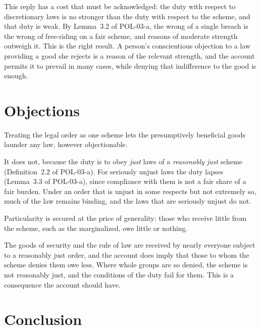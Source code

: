 \documentclass{situationist-preprint}
\begin{document}
This reply has a cost that must be acknowledged: the duty with respect to discretionary laws is no stronger than the duty with respect to the scheme, and that duty is weak. By Lemma~3.2 of POL-03-a, the wrong of a single breach is the wrong of free-riding on a fair scheme, and reasons of moderate strength outweigh it. This is the right result. A person's conscientious objection to a law providing a good she rejects is a reason of the relevant strength, and the account permits it to prevail in many cases, while denying that indifference to the good is enough.

\section{Objections}

\begin{objection}
Treating the legal order as one scheme lets the presumptively beneficial goods launder any law, however objectionable.
\end{objection}

\begin{reply}
It does not, because the duty is to obey \emph{just} laws of a \emph{reasonably just} scheme (Definition~2.2 of POL-03-a). For seriously unjust laws the duty lapses (Lemma~3.3 of POL-03-a), since compliance with them is not a fair share of a fair burden. Under an order that is unjust in some respects but not extremely so, much of the law remains binding, and the laws that are seriously unjust do not.
\end{reply}

\begin{objection}
Particularity is secured at the price of generality: those who receive little from the scheme, such as the marginalized, owe little or nothing.
\end{objection}

\begin{reply}
The goods of security and the rule of law are received by nearly everyone subject to a reasonably just order, and the account does imply that those to whom the scheme denies them owe less. Where whole groups are so denied, the scheme is not reasonably just, and the conditions of the duty fail for them. This is a consequence the account should have.
\end{reply}

\section{Conclusion}
\end{document}
